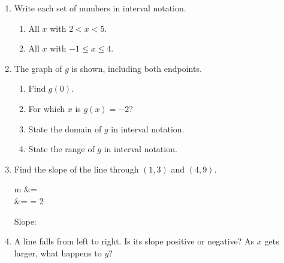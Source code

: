 \documentclass[10pt]{article}
\begin{document}

\vspace{0.12in}

\begin{enumerate}[itemsep=12pt]

\item Write each set of numbers in interval notation.

\begin{enumerate}[label=(\alph*), itemsep=8pt]
  \item All $x$ with $2 < x < 5$. \hfill \blank{3cm}
  \item All $x$ with $-1 \le x \le 4$. \hfill \blank{3cm}
\end{enumerate}

\item \begin{minipage}[t]{0.52\linewidth}
The graph of $g$ is shown, including both endpoints.

\begin{enumerate}[label=(\alph*), itemsep=10pt]
  \item Find $g(0)$. \hfill \blank{2.2cm}
  \item For which $x$ is $g(x) = -2$? \hfill \blank{2.2cm}
  \item State the domain of $g$ in interval notation. \hfill \blank{2.2cm}
  \item State the range of $g$ in interval notation. \hfill \blank{2.2cm}
\end{enumerate}
\end{minipage}\hfill
\begin{minipage}[t]{0.4\linewidth}
\vspace{-6pt}
\centering
{}
\end{minipage}

\item Find the slope of the line through $(1, 3)$ and $(4, 9)$.

\begin{work}
  m &=  \\
    &=  = 2
\end{work}

Slope: \blank{2.2cm}

\item A line falls from left to right. Is its slope positive or negative? As $x$ gets larger,
what happens to $y$?

\vspace{4pt}
\blank{9cm}

\end{enumerate}
\end{document}
